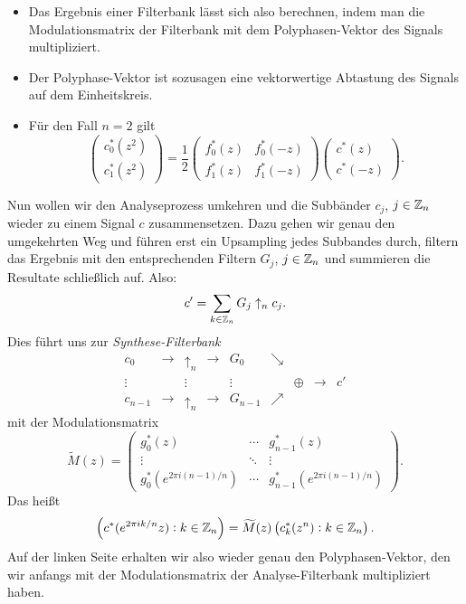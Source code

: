 \begin{remark} \leavevmode
\begin{itemize}
\item Das Ergebnis einer Filterbank lässt sich also berechnen, indem man die Modulationsmatrix der
  Filterbank mit dem Polyphasen-Vektor des Signals multipliziert.
\item Der Polyphase-Vektor ist sozusagen eine vektorwertige Abtastung des
  Signals auf dem Einheitskreis. 
\item Für den Fall $ n = 2 $ gilt
  \[
    \begin{pmatrix}
      c_{0}^{*}(z^{2}) \\
      c_{1}^{*}(z^{2})
    \end{pmatrix}
  = \frac{1}{2}
    \begin{pmatrix}
      f_{0}^{*}(z) & f_{0}^{*}(-z) \\
      f_{1}^{*}(z) & f_{1}^{*}(-z)
    \end{pmatrix}
    \begin{pmatrix}
      c^{*}(z) \\
      c^{*}(-z)
    \end{pmatrix}.
  \]
\end{itemize}
\end{remark}

Nun wollen wir den Analyseprozess umkehren und die Subbänder $ c_{j} $, $ j \in \mathbb{Z}_{n} $ wieder zu
einem Signal $ c $ zusammensetzen. Dazu gehen wir genau den umgekehrten Weg und führen erst ein
Upsampling jedes Subbandes durch, filtern das Ergebnis mit den entsprechenden Filtern $ G_{j} $,
$ j \in \mathbb{Z}_{n} $ und summieren die Resultate schließlich auf. Also:
\[
  c' = \sum_{k \in \mathbb{Z}_{n}} G_{j} \uparrow_{n} c_{j}.
\]
Dies führt uns zur \emph{Synthese-Filterbank}
\[
  \begin{array}{*{9}{c}}
    c_{0} & \rightarrow & \boxed{\uparrow_{n}} & \rightarrow & \boxed{G_{0}} & \searrow & & \\
    \vdots & & \vdots & & \vdots & & \oplus & \rightarrow & c' \\
    c_{n-1} & \rightarrow & \boxed{\uparrow_{n}} & \rightarrow & \boxed{G_{n-1}} & \nearrow & &
  \end{array}
\]
mit der Modulationsmatrix
\[
  \widetilde{M}(z) = \begin{pmatrix}
    g_{0}^{*}(z) & \cdots & g_{n-1}^{*}(z) \\
    \vdots & \ddots & \vdots \\
    g_{0}^{*}(e^{2\pi i(n-1)/n}) & \cdots & g_{n-1}^{*}(e^{2\pi i(n-1)/n})
  \end{pmatrix}.
\]
Das heißt
\[
    \left( c^{*}(e^{2\pi ik/n}z) : k \in \mathbb{Z}_{n} \right)
  = \widetilde{M}(z) \left( c^{*}_{k}(z^{n}) : k \in \mathbb{Z}_{n} \right).
\]
Auf der linken Seite erhalten wir also wieder genau den Polyphasen-Vektor, den wir anfangs mit der 
Modulationsmatrix der Analyse-Filterbank multipliziert haben.

